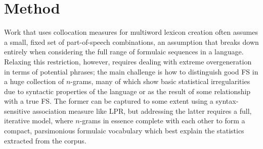 \documentclass[11pt]{article}
\begin{document}
\section{Method}

Work that uses collocation measures for multiword lexicon creation often assumes a small, fixed set of part-of-speech combinations, an assumption that breaks down entirely when considering the full range of formulaic sequences in a language. Relaxing this restriction, however, requires dealing with extreme overgeneration in terms of potential phrases; the main challenge is how to distinguish good FS in a huge collection of $n$-grams, many of which show basic statistical irregularities due to syntactic properties of the language or as the result of some relationship with a true FS. The former can be captured to some extent using a syntax-sensitive association measure like LPR, but addressing the latter requires a full, iterative model, where $n$-grams in essence complete with each other to form a compact, parsimonious formulaic vocabulary which best explain the statistics extracted from the corpus.

\end{document}
